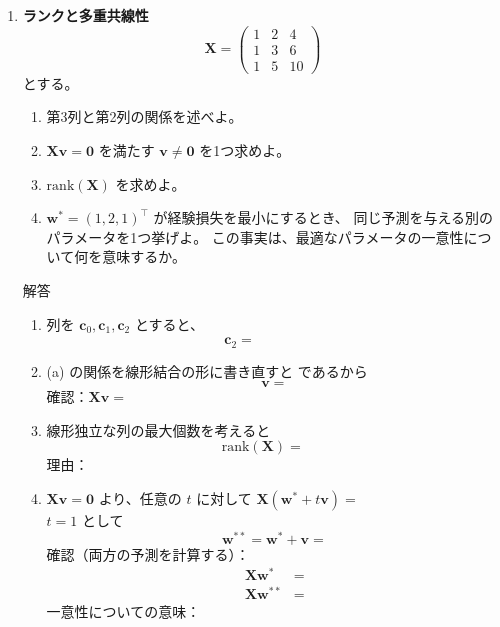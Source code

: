 \documentclass[a4paper,dvipdfmx]{jsarticle}
\newcommand{\提出期限}{2026年10月12日（月）}
\newcommand{\学籍番号}{0000000}
\newcommand{\氏名}{氏名を書く}
\newcommand{\提出日}{2026年10月12日}
\newenvironment{answer}{\begin{itembox}[l]{解答}}{\end{itembox}}
\begin{document}
\begin{enumerate}
  \item \textbf{ランクと多重共線性}\quad
    \begin{equation*}
      \bm{X} = \begin{pmatrix} 1 & 2 & 4 \\ 1 & 3 & 6 \\ 1 & 5 & 10 \end{pmatrix}
    \end{equation*}
    とする。
    \begin{enumerate}
      \item 第3列と第2列の関係を述べよ。
      \item $\bm{X}\bm{v} = \bm{0}$ を満たす $\bm{v} \neq \bm{0}$ を1つ求めよ。
      \item $\mathrm{rank}(\bm{X})$ を求めよ。
      \item $\bm{w}^* = (1, 2, 1)^\top$ が経験損失を最小にするとき、
        同じ予測を与える別のパラメータを1つ挙げよ。
        この事実は、最適なパラメータの一意性について何を意味するか。
    \end{enumerate}
    \begin{answer}
      \begin{enumerate}
        \item 列を $\bm{c}_0, \bm{c}_1, \bm{c}_2$ とすると、
          \begin{equation*}
            \bm{c}_2 = \phantom{XXXXXX}
          \end{equation*}
        \item (a) の関係を線形結合の形に書き直すと \phantom{XXXXXXXXXXXX} であるから
          \begin{equation*}
            \bm{v} =
          \end{equation*}
          確認：$\bm{X}\bm{v} = $
        \item 線形独立な列の最大個数を考えると
          \begin{equation*}
            \mathrm{rank}(\bm{X}) = \phantom{XX}
          \end{equation*}
          理由：
        \item $\bm{X}\bm{v} = \bm{0}$ より、任意の $t$ に対して $\bm{X}(\bm{w}^* + t\bm{v}) = $ \phantom{XXXXXX} \\
          $t = 1$ として
          \begin{equation*}
            \bm{w}^{**} = \bm{w}^* + \bm{v} =
          \end{equation*}
          確認（両方の予測を計算する）：
          \begin{align*}
            \bm{X}\bm{w}^*   &= \\
            \bm{X}\bm{w}^{**} &=
          \end{align*}
          一意性についての意味：
      \end{enumerate}
    \end{answer}


\end{enumerate}
\end{document}
